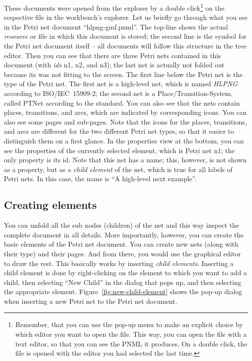 These documents were opened from the explorer by a double click\footnote
 {Remember, that you can use the pop-up menu to make an explicit choice
  by which editor you want to open the file. This way, you can open
  the file with a text editor, so that you can see the PNML
  it produces. On a double click, the file is opened
  with the editor you had selected the last time.}
on the respective file in the workbench's explorer. Let us briefly go through
what you see in the Petri net document ``hlpng-gmf.pnml''.  The top-line shows the
actual \emph{resource}%
or file in which this document is stored; the second
line is the symbol for the Petri net document itself -- all documents will
follow this structure in the tree editor. Then you can see that
there are three Petri nets contained in this document (with \emph{ids}%
n1, n2, and n3); the last net is actually not folded out because
its was not fitting to the screen. The first line below the 
Petri net is the type of the Petri net. The first net
is a high-level net, which is named \emph{HLPNG}%
according to ISO/IEC~15909-2;
the second net is a Place/Transition-System, called PTNet according
to the standard. You can also see that the nets contain places, transitions,
and arcs, which are indicated by corresponding icons. You can also see
some pages and sub-pages.  Note that the icons for the places, transitions,
and arcs are different for the two different Petri net types, so that it
easier to distinguish them on a first glance. In the properties view at the
bottom, you can see the properties of the currently selected element, which is
Petri net n1; the only property is its id. Note that this net has a
name; this, however, is not shown as a property, but as a \emph{child element}%
of the net, which is true for all labels of Petri nets. In this case, the name is 
``A high-level next example''.

\subsection{Creating elements}
\label{subsec:creating-elements}

You can unfold all the sub nodes (children) of the net and this way
inspect the complete document in all details. More importantly, however,
you can create the basic elements of the Petri net document. You can
create new nets (along with their type) and their pages. And from there, you
would use the graphical editor to draw the rest.  This basically works by
inserting \emph{child elements}.%
Inserting a child element is done by
right-clicking on the element to which you want to add a child, then selecting
``New Child'' in the dialog that pops up, and then selecting the appropriate
element. Figure~\ref{fig:new-child-element} shows the pop-up dialog when
inserting a new Petri net to the Petri net document.

